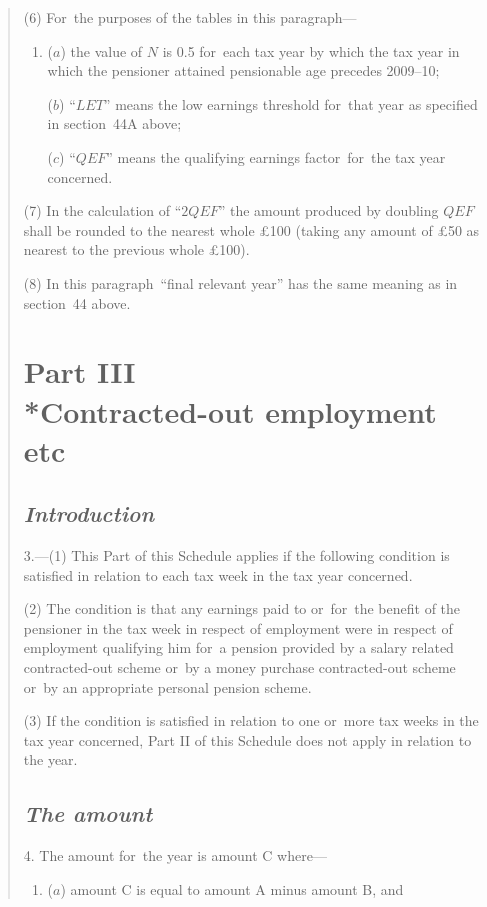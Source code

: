 \documentclass[12pt,a4paper]{article}
\begin{document}
\begin{quotation}
(6) For~the purposes of the tables in this paragraph—
\begin{enumerate}\item[]
($a$) the value of $N$ is 0$.$5 for~each tax year by which the tax year in which the pensioner attained pensionable age precedes 2009--10;

($b$) “$LET$” means the low earnings threshold for~that year as specified in section~44A above;

($c$) “$QEF$” means the qualifying earnings factor~for~the tax year concerned.
\end{enumerate}

(7) In the calculation of “$2QEF$” the amount produced by doubling $QEF$ shall be rounded to the nearest whole £100 (taking any amount of £50 as nearest to the previous whole £100).

(8) In this paragraph~“final relevant year” has the same meaning as in section~44 above.

\vfill

\section*{Part III\\*Contracted-out employment etc}
\subsection*{\itshape Introduction}

3.---(1) This Part of this Schedule applies if the following condition is satisfied in relation to each tax week in the tax year concerned.

(2) The condition is that any earnings paid to or~for~the benefit of the pensioner in the tax week in respect of employment were in respect of employment qualifying him for~a pension provided by a salary related contracted-out scheme or~by a money purchase contracted-out scheme or~by an appropriate personal pension scheme.

(3) If the condition is satisfied in relation to one or~more tax weeks in the tax year 
concerned, Part II of this Schedule does not apply in relation to the year.

\subsection*{\itshape The amount}

4. The amount for~the year is amount C where—
\begin{enumerate}\item[]
($a$) amount C is equal to amount A minus amount B, and


\end{enumerate}
\end{quotation}
\end{document}
